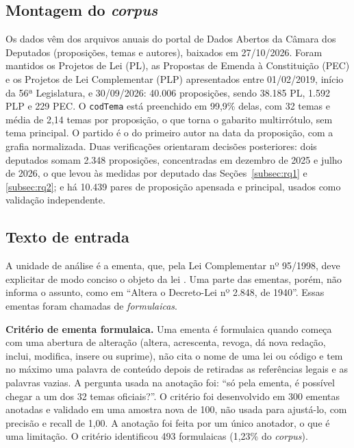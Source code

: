 \subsection{Montagem do \textit{corpus}}
\label{subsec:corpus}

Os dados vêm dos arquivos anuais do portal de Dados Abertos da Câmara dos Deputados (proposições, temas e autores), baixados em 27/10/2026. Foram mantidos os Projetos de Lei (PL), as Propostas de Emenda à Constituição (PEC) e os Projetos de Lei Complementar (PLP) apresentados entre 01/02/2019, início da 56ª Legislatura, e 30/09/2026: 40.006 proposições, sendo 38.185 PL, 1.592 PLP e 229 PEC. O \texttt{codTema} está preenchido em 99,9\% delas, com 32 temas e média de 2,14 temas por proposição, o que torna o gabarito multirrótulo, sem tema principal. O partido é o do primeiro autor na data da proposição, com a grafia normalizada. Duas verificações orientaram decisões posteriores: dois deputados somam 2.348 proposições, concentradas em dezembro de 2025 e julho de 2026, o que levou às medidas por deputado das Seções~\ref{subsec:rq1} e \ref{subsec:rq2}; e há 10.439 pares de proposição apensada e principal, usados como validação independente.

\subsection{Texto de entrada}
\label{subsec:texto}

A unidade de análise é a ementa, que, pela Lei Complementar nº 95/1998, deve explicitar de modo conciso o objeto da lei \citep{brasil1998lc95}. Uma parte das ementas, porém, não informa o assunto, como em ``Altera o Decreto-Lei nº 2.848, de 1940''. Essas ementas foram chamadas de \textit{formulaicas}.

\textbf{Critério de ementa formulaica.} Uma ementa é formulaica quando começa com uma abertura de alteração (altera, acrescenta, revoga, dá nova redação, inclui, modifica, insere ou suprime), não cita o nome de uma lei ou código e tem no máximo uma palavra de conteúdo depois de retiradas as referências legais e as palavras vazias. A pergunta usada na anotação foi: ``só pela ementa, é possível chegar a um dos 32 temas oficiais?''. O critério foi desenvolvido em 300 ementas anotadas e validado em uma amostra nova de 100, não usada para ajustá-lo, com precisão e recall de 1,00. A anotação foi feita por um único anotador, o que é uma limitação. O critério identificou 493 formulaicas (1,23\% do \textit{corpus}).

